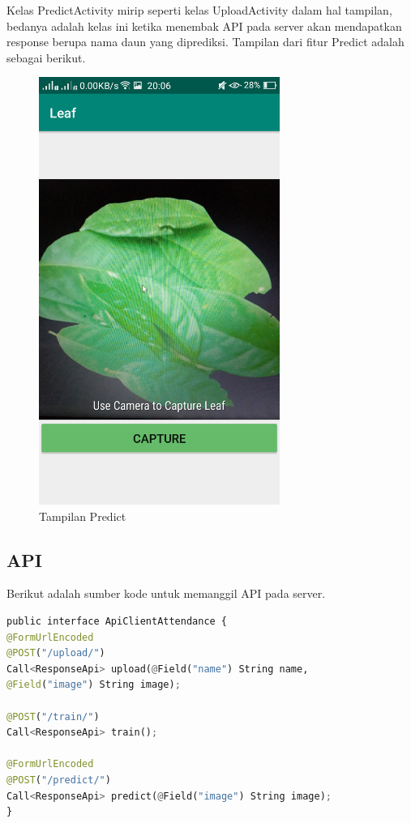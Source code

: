 \par Kelas PredictActivity mirip seperti kelas UploadActivity dalam hal tampilan, bedanya adalah kelas ini ketika menembak API pada server akan mendapatkan response berupa nama daun yang diprediksi. Tampilan dari fitur Predict adalah sebagai berikut.
\begin{figure}[H]
	\centering\includegraphics[width=0.7\textwidth]{bab4/figures/predict.png}
	\caption{Tampilan Predict}
	\label{fig:predict}
\end{figure}
\subsection{API}
\par Berikut adalah sumber kode untuk memanggil API pada server.

\begin{lstlisting}[language=python, caption=Pemanggilan API menggunakan Retrofit2, label=code:api, firstnumber=0]
public interface ApiClientAttendance {
@FormUrlEncoded
@POST("/upload/")
Call<ResponseApi> upload(@Field("name") String name,
@Field("image") String image);

@POST("/train/")
Call<ResponseApi> train();

@FormUrlEncoded
@POST("/predict/")
Call<ResponseApi> predict(@Field("image") String image);
}
\end{lstlisting}